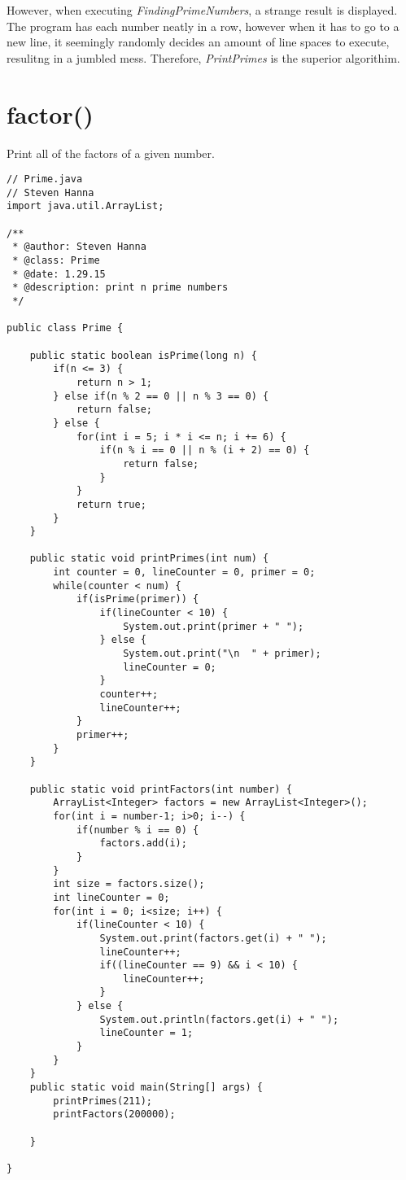 \documentclass[12pt]{article}
\begin{document}
However, when executing \textit{FindingPrimeNumbers}, a strange result is displayed.  The program has each number neatly in a row, however when it has to go to a new line, it seemingly randomly decides an amount of line spaces to execute, resulitng in a jumbled mess.  Therefore, \textit{PrintPrimes} is the superior algorithim.
\newpage
\section{factor()}
Print all of the factors of a given number.  
\begin{lstlisting}
// Prime.java
// Steven Hanna
import java.util.ArrayList;

/**
 * @author: Steven Hanna
 * @class: Prime
 * @date: 1.29.15
 * @description: print n prime numbers
 */

public class Prime {
	
	public static boolean isPrime(long n) {
	    if(n <= 3) {
	        return n > 1;
	    } else if(n % 2 == 0 || n % 3 == 0) {
	        return false;
	    } else {
	        for(int i = 5; i * i <= n; i += 6) {
	            if(n % i == 0 || n % (i + 2) == 0) {
	                return false;
	            }
	        }
	        return true;
	    }
	}

	public static void printPrimes(int num) {
		int counter = 0, lineCounter = 0, primer = 0;
		while(counter < num) {
			if(isPrime(primer)) {
				if(lineCounter < 10) {
					System.out.print(primer + " ");		
				} else {
					System.out.print("\n  " + primer);
					lineCounter = 0;
				}
				counter++;
				lineCounter++;
			}			
			primer++;
		}
	}
	
	public static void printFactors(int number) {
		ArrayList<Integer> factors = new ArrayList<Integer>();
		for(int i = number-1; i>0; i--) {
			if(number % i == 0) {
				factors.add(i);
			}
		}
		int size = factors.size();
		int lineCounter = 0;
		for(int i = 0; i<size; i++) {				
			if(lineCounter < 10) {
				System.out.print(factors.get(i) + " ");
				lineCounter++;
				if((lineCounter == 9) && i < 10) {
					lineCounter++;
				}
			} else {
				System.out.println(factors.get(i) + " ");
				lineCounter = 1;
			}
		}
	}
	public static void main(String[] args) {
		printPrimes(211);
		printFactors(200000);

	}

}

\end{lstlisting}
\end{document}
